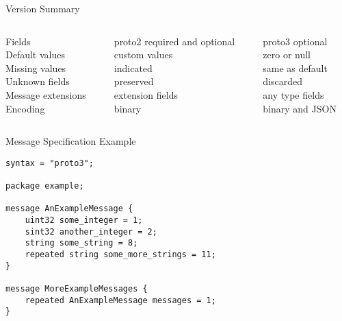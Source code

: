 \begin{frame}{Version Summary}
    \begin{columns}[b]
        \begin{column}{.3\textwidth}
            Fields \\
            Default values \\
            Missing values \\
            Unknown fields \\
            Message extensions \\
            Encoding \\
            \vspace{4pt}
        \end{column}
        \begin{column}{.3\textwidth}
            \begin{block}{proto2}
                required and optional \\
                custom values \\
                indicated \\
                preserved \\
                extension fields \\
                binary \\
            \end{block}
        \end{column}
        \begin{column}{.3\textwidth}
            \begin{block}{proto3}
                optional \\
                zero or null \\
                same as default \\
                discarded \\
                any type fields \\
                binary and JSON \\
            \end{block}
        \end{column}
    \end{columns}
\end{frame}


\begin{frame}[fragile]{Message Specification Example}
\begin{lstlisting}[style=mini]
syntax = "proto3";

package example;

message AnExampleMessage {
    uint32 some_integer = 1;
    sint32 another_integer = 2;
    string some_string = 8;
    repeated string some_more_strings = 11;
}

message MoreExampleMessages {
    repeated AnExampleMessage messages = 1;
}
\end{lstlisting}
\end{frame}


